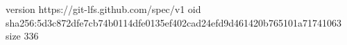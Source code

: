 version https://git-lfs.github.com/spec/v1
oid sha256:5d3c872dfe7cb74b0114dfe0135ef402cad24efd9d461420b765101a71741063
size 336
